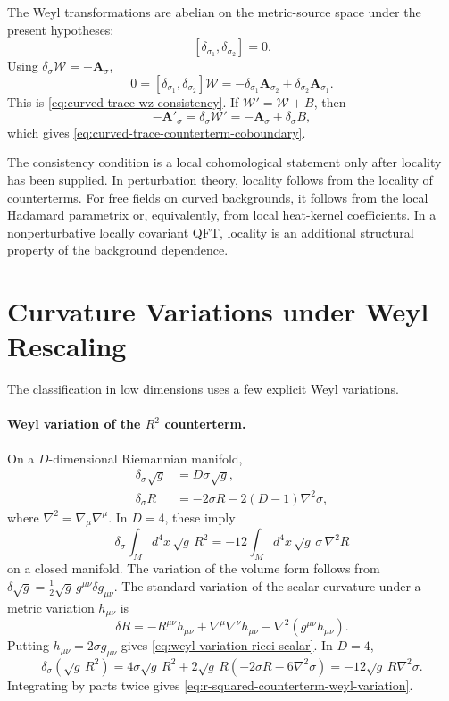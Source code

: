 The Weyl transformations are abelian on the metric-source space under the
present hypotheses:
\[
  [\delta_{\sigma_1},\delta_{\sigma_2}]=0 .
\]
Using \(\delta_\sigma\mathcal W=-\mathbf A_\sigma\),
\[
  0
  =
  [\delta_{\sigma_1},\delta_{\sigma_2}]\mathcal W
  =
  -\delta_{\sigma_1}\mathbf A_{\sigma_2}
  +\delta_{\sigma_2}\mathbf A_{\sigma_1}.
\]
This is \eqref{eq:curved-trace-wz-consistency}.  If
\(\mathcal W'=\mathcal W+B\), then
\[
  -\mathbf A'_\sigma
  =
  \delta_\sigma\mathcal W'
  =
  -\mathbf A_\sigma+\delta_\sigma B,
\]
which gives \eqref{eq:curved-trace-counterterm-coboundary}.

The consistency condition is a local cohomological statement only after
locality has been supplied.  In
perturbation theory, locality follows from the locality of counterterms.  For
free fields on curved backgrounds, it follows from the local Hadamard
parametrix or, equivalently, from local heat-kernel coefficients.  In a
nonperturbative locally covariant QFT, locality is an additional structural
property of the background dependence.

\section{Curvature Variations under Weyl Rescaling}

The classification in low dimensions uses a few explicit Weyl variations.
\paragraph{Weyl variation of the \(R^2\) counterterm.}
On a \(D\)-dimensional Riemannian manifold,
\begin{align}
  \delta_\sigma\sqrt g
  &=
  D\sigma\sqrt g,
  \label{eq:weyl-variation-volume}\\
  \delta_\sigma R
  &=
  -2\sigma R-2(D-1)\nabla^2\sigma,
  \label{eq:weyl-variation-ricci-scalar}
\end{align}
where \(\nabla^2=\nabla_\mu\nabla^\mu\).  In \(D=4\), these imply
\begin{equation}
  \delta_\sigma\int_M d^4x\,\sqrt g\,R^2
  =
  -12\int_M d^4x\,\sqrt g\,\sigma\,\nabla^2R
  \label{eq:r-squared-counterterm-weyl-variation}
\end{equation}
on a closed manifold.
The variation of the volume form follows from
\(\delta\sqrt g=\frac12\sqrt g\,g^{\mu\nu}\delta g_{\mu\nu}\).  The standard
variation of the scalar curvature under a metric variation \(h_{\mu\nu}\) is
\[
  \delta R
  =
  -R^{\mu\nu}h_{\mu\nu}
  +\nabla^\mu\nabla^\nu h_{\mu\nu}
  -\nabla^2(g^{\mu\nu}h_{\mu\nu}).
\]
Putting \(h_{\mu\nu}=2\sigma g_{\mu\nu}\) gives
\eqref{eq:weyl-variation-ricci-scalar}.  In \(D=4\),
\[
  \delta_\sigma(\sqrt g\,R^2)
  =
  4\sigma\sqrt g\,R^2
  +2\sqrt g\,R(-2\sigma R-6\nabla^2\sigma)
  =
  -12\sqrt g\,R\nabla^2\sigma .
\]
Integrating by parts twice gives
\eqref{eq:r-squared-counterterm-weyl-variation}.

